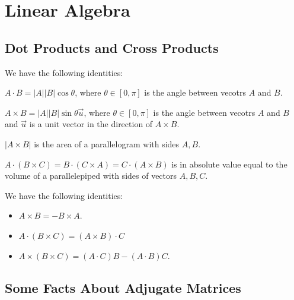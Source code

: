 \section{Linear Algebra}

\subsection{Dot Products and Cross Products}

\begin{proposition}
We have the following identities:
\item $A \cdot B = |A||B| \cos \theta$, where $\theta \in [0, \pi]$ is the angle 
between vecotrs $A$ and $B$.
\item $A \times B = |A||B| \sin \theta \vec{u}$, where $\theta \in [0, \pi]$ is the angle 
between vecotrs $A$ and $B$ and $\vec{u}$ is a unit vector in the direction of $A \times B$.
\end{proposition}

\begin{proposition}
 $|A \times B|$ is the area of a parallelogram with sides $A, B$.
\end{proposition}

\begin{proposition}
$A \cdot (B \times C) = B \cdot (C \times A) = C \cdot (A \times B)$ 
is in absolute value equal to the volume of a parallelepiped with 
sides of vectors $A,B,C$.
\end{proposition}

\begin{proposition}
We have the following identities:
\begin{itemize}
    \item $A \times B = - B \times A$.
    \item $A \cdot (B \times C) = (A \times B) \cdot C$
    \item $A \times (B \times C) = (A \cdot C) B - (A \cdot B)C$.
\end{itemize}
\end{proposition}

\subsection{Some Facts About Adjugate Matrices}

